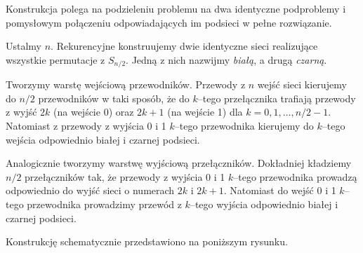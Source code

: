 \documentclass[a4paper]{article}
\theoremstyle{definition}
\begin{document}
Konstrukcja polega na podzieleniu problemu na dwa identyczne podproblemy i pomysłowym połączeniu odpowiadających im podsieci w pełne rozwiązanie.

\vspace{.5em}

Ustalmy \(n\). Rekurencyjne konstruujemy dwie identyczne sieci realizujące wszystkie permutacje z \(S_{n/2}\). Jedną z nich nazwijmy \emph{białą}, a drugą \emph{czarną}. 

\vspace{.5em}

Tworzymy warstę wejściową przewodników. Przewody z \(n\) wejść sieci kierujemy do \(n/2\) przewodników w taki sposób, że do \(k\)--tego przełącznika trafiają przewody z wyjść \(2k\) (na wejście 0) oraz \(2k+1\) (na wejście 1) dla \(k = 0, 1, \ldots, n/2 - 1\). Natomiast z przewody z wyjścia 0 i 1 \(k\)--tego przewodnika kierujemy do \(k\)--tego wejścia odpowiednio białej i czarnej podsieci. 

\vspace{.5em}

Analogicznie tworzymy warstwę wyjściową przełączników. Dokładniej kładziemy \(n/2\) przełączników tak, że przewody z wyjścia 0 i 1 \(k\)--tego przewodnika prowadzą odpowiednio do wyjść sieci o numerach \(2k\) i \(2k+1\). Natomiast do wejść 0 i 1 \(k\)--tego przewodnika prowadzimy przewód z \(k\)--tego wyjścia odpowiednio białej i czarnej podsieci. 

\vspace{.5em}

Konstrukcję schematycznie przedstawiono na poniższym rysunku.
\end{document}
